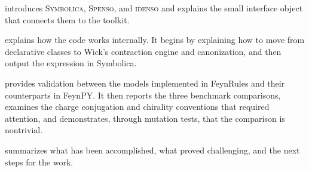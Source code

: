  introduces \textsc{Symbolica}, \textsc{Spenso}, and \textsc{idenso} and explains the small interface object that connects them to the toolkit.

 explains how the code works internally. It begins by explaining how to move from declarative classes to Wick's contraction engine and canonization, and then output the expression in Symbolica.

 provides validation between the models implemented in FeynRules and their counterparts in FeynPY. It then reports the three benchmark comparisons, examines the charge conjugation and chirality conventions that required attention, and demonstrates, through mutation tests, that the comparison is nontrivial.

 summarizes what has been accomplished, what proved challenging, and the next steps for the work.